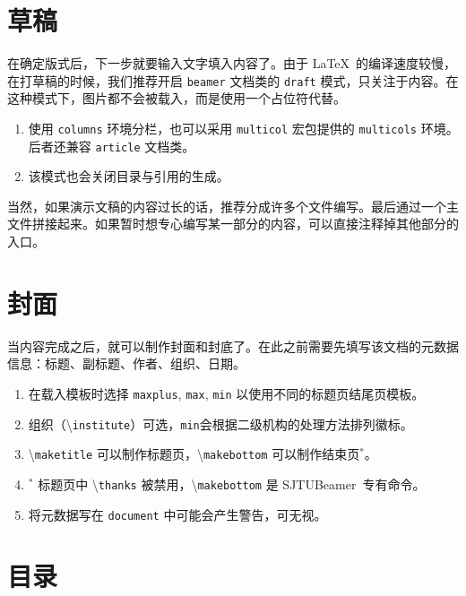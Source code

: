 \documentclass[
    UTF8,
    heading=true,
    12pt,
    a4paper
]{ctexrep}
\newenvironment{commentlist}{\begin{enumerate}\small}{\end{enumerate}}
\newcommand{\cmd}[1]{\textbackslash{}\texttt{#1}}
\def\themename{\textsf{SJTUBeamer}}
\begin{document}

\chapter{草稿}

在确定版式后，下一步就要输入文字填入内容了。由于 \LaTeX\ 的编译速度较慢，在打草稿的时候，我们推荐开启 \texttt{beamer} 文档类的 \texttt{draft} 模式，只关注于内容。在这种模式下，图片都不会被载入，而是使用一个占位符代替。


\begin{commentlist}
  \item 使用 \texttt{columns} 环境分栏，也可以采用 \texttt{multicol} 宏包提供的 \texttt{multicols} 环境。后者还兼容 \texttt{article} 文档类。
  \item 该模式也会关闭目录与引用的生成。
\end{commentlist}

\clearpage

当然，如果演示文稿的内容过长的话，推荐分成许多个文件编写。最后通过一个主文件拼接起来。如果暂时想专心编写某一部分的内容，可以直接注释掉其他部分的入口。


\chapter{封面}

当内容完成之后，就可以制作封面和封底了。在此之前需要先填写该文档的元数据信息：标题、副标题、作者、组织、日期。


\begin{commentlist}
  \item 在载入模板时选择 \texttt{maxplus}, \texttt{max}, \texttt{min} 以使用不同的标题页结尾页模板。
  \item 组织（\cmd{institute}）可选，\texttt{min}会根据二级机构的处理方法排列徽标。
  \item \cmd{maketitle} 可以制作标题页，\cmd{makebottom} 可以制作结束页$^*$。
  \item$^*$ 标题页中 \cmd{thanks} 被禁用，\cmd{makebottom} 是 \themename\ 专有命令。
  \item[\faExclamationTriangle] 将元数据写在 \texttt{document} 中可能会产生警告，可无视。
\end{commentlist}

\chapter{目录}
\end{document}
